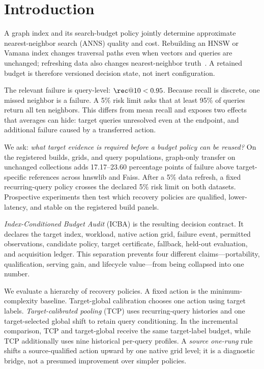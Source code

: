 \section{Introduction}
\label{sec:intro}

A graph index and its search-budget policy jointly determine approximate nearest-neighbor search (ANNS) quality and cost. Rebuilding an HNSW or Vamana index changes traversal paths even when vectors and queries are unchanged; refreshing data also changes nearest-neighbor truth~\cite{malkov2020hnsw,subramanya2019diskann}. A retained budget is therefore versioned decision state, not inert configuration.

The relevant failure is query-level: $\rec@10<0.95$. Because recall is discrete, one missed neighbor is a failure. A 5\% risk limit asks that at least 95\% of queries return all ten neighbors. This differs from mean recall and exposes two effects that averages can hide: target queries unresolved even at the endpoint, and additional failure caused by a transferred action.

We ask: \emph{what target evidence is required before a budget policy can be reused?} On the registered builds, grids, and query populations, graph-only transfer on unchanged collections adds 17.17--23.60 percentage points of failure above target-specific references across hnswlib and Faiss. After a 5\% data refresh, a fixed recurring-query policy crosses the declared 5\% risk limit on both datasets. Prospective experiments then test which recovery policies are qualified, lower-latency, and stable on the registered build panels.

\emph{Index-Conditioned Budget Audit} (ICBA) is the resulting decision contract. It declares the target index, workload, native action grid, failure event, permitted observations, candidate policy, target certificate, fallback, held-out evaluation, and acquisition ledger. This separation prevents four different claims---portability, qualification, serving gain, and lifecycle value---from being collapsed into one number.

We evaluate a hierarchy of recovery policies. A fixed action is the minimum-complexity baseline. Target-global calibration chooses one action using target labels. \emph{Target-calibrated pooling} (TCP) uses recurring-query histories and one target-selected global shift to retain query conditioning. In the incremental comparison, TCP and target-global receive the same target-label budget, while TCP additionally uses nine historical per-query profiles. A \emph{source one-rung} rule shifts a source-qualified action upward by one native grid level; it is a diagnostic bridge, not a presumed improvement over simpler policies.

